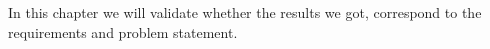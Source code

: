 In this chapter we will validate whether the results we got, correspond to the requirements and problem statement.